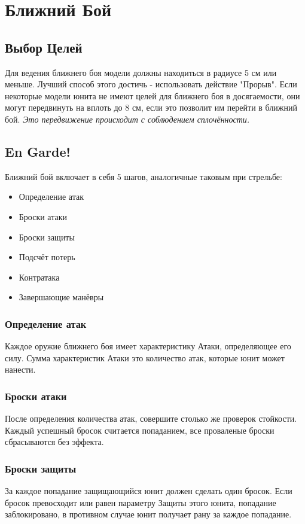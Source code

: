 \documentclass[twocolumn]{article}
\begin{document}
\newpage

\section{Ближний Бой}
\subsection{Выбор Целей}
Для ведения ближнего боя модели должны находиться в радиусе 5 см или меньше. Лучший способ этого достичь - использовать действие "Прорыв". Если некоторые модели юнита не имеют целей для ближнего боя в досягаемости, они могут передвинуть на вплоть до 8 см, если это позволит им перейти в ближний бой. \emph{Это передвижение происходит с соблюдением сплочённости.}

\subsection{En Garde!}
Ближний бой включает в себя 5 шагов, аналогичные таковым при стрельбе:
\begin{itemize}
    \item Определение атак
    \item Броски атаки
    \item Броски защиты
    \item Подсчёт потерь
    \item Контратака
    \item Завершающие манёвры
\end{itemize}

\subsubsection{Определение атак}
Каждое оружие ближнего боя имеет характеристику Атаки, определяющее его силу.
Сумма характеристик Атаки это количество атак, которые юнит может нанести.
\subsubsection{Броски атаки}
После определения количества атак, совершите столько же проверок стойкости.
Каждый успешный бросок считается попаданием, все проваленые броски сбрасываются без эффекта.
\subsubsection{Броски защиты}
За каждое попадание защищающийся юнит должен сделать один бросок. Если бросок превосходит или равен параметру Защиты этого юнита, попадание заблокировано, в противном случае юнит получает рану за каждое попадание.
\end{document}
